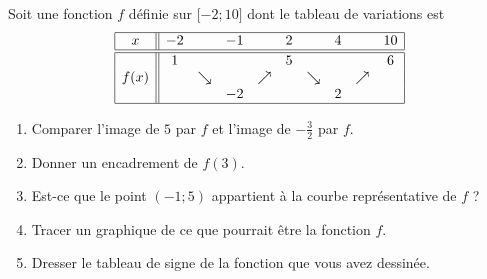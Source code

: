 
\begin{exercice}\label{exosmath-0546}

    Soit une fonction \( f\) définie sur \( \mathopen[ -2; 10 \mathclose]\) dont le tableau de variations est
    \begin{equation*}
        \begin{array}[]{|c||ccccccccc|}
            \hline
            x&-2&&-1&&2&&4&&10\\
            \hline\hline
            &1&&&&5&&&&6\\
            f(x)&&\searrow&&\nearrow&&\searrow&&\nearrow&\\
            &&&-2&&&&2&&\\
            \hline
        \end{array}
    \end{equation*}
    \begin{enumerate}
        \item
            Comparer l'image de \( 5\) par \( f\) et l'image de \( -\frac{ 3 }{2}\) par \( f\). 
        \item
            Donner un encadrement de \( f(3)\).
        \item
            Est-ce que le point \( (-1;5)\) appartient à la courbe représentative de \( f\) ?
        \item
            Tracer un graphique de ce que pourrait être la fonction \( f\).
        \item
            Dresser le tableau de signe de la fonction que vous avez dessinée.
    \end{enumerate}

\end{exercice}
